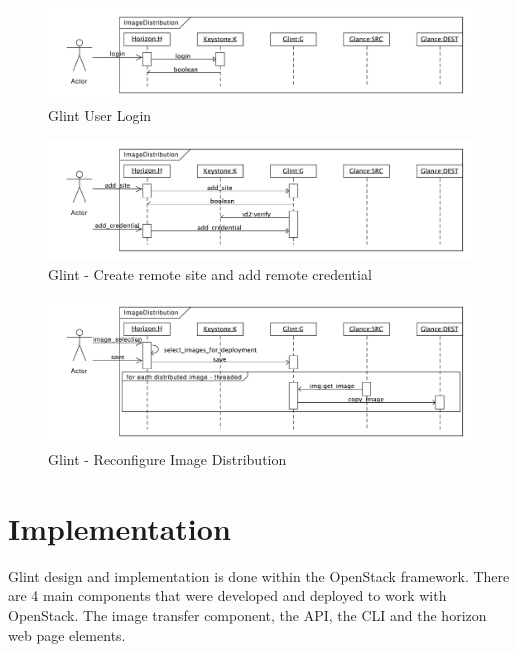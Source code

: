 \documentclass[a4paper]{jpconf}
\begin{document}
\begin{figure}[h]
\begin{center}
\includegraphics[width=36pc]{images/glintlogin.pdf}
\caption{\label{fig:glintlogin}Glint User Login}
\end{center}
\end{figure}

\begin{figure}[h]
\begin{center}
\includegraphics[width=36pc]{images/glintsitecred.pdf}
\caption{\label{fig:glintsitecred}Glint - Create remote site and add remote credential}
\end{center}
\end{figure}

\begin{figure}[h]
\begin{center}
\includegraphics[width=36pc]{images/glintdist.pdf}
\caption{\label{fig:glintdist}Glint - Reconfigure Image Distribution}
\end{center}
\end{figure}

\section{Implementation}

Glint design and implementation is done within the OpenStack framework. There are 4 main components that were developed and deployed to work with OpenStack. The image transfer component, the API, the CLI and the horizon web page elements. 
\end{document}
